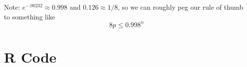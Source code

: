 \documentclass[12pt,titlepage]{article}
\begin{document}
Note: $e^{-.00232} \approx 0.998$ and $0.126 \approx 1/8$, so we can roughly peg our rule of thumb to something like
\[
8 p \leq 0.998^{n} %
\]
\newpage
\newpage 
\section*{R Code}

\end{document}
